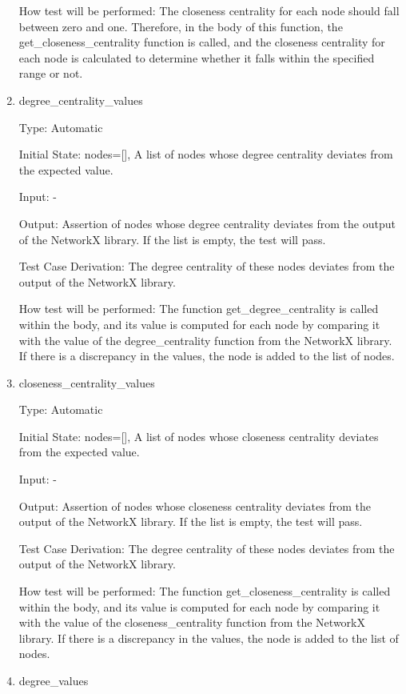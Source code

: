 \documentclass[12pt, titlepage]{article}
\begin{document}
\begin{enumerate}
How test will be performed: The closeness centrality for each node should fall between zero and one. Therefore, in the body of this function, the {get\_closeness\_centrality} function is called, and the closeness centrality for each node is calculated to determine whether it falls within the specified range or not.

\item{degree\_centrality\_values\\}

Type: Automatic
					
Initial State: nodes=[], A list of nodes whose degree centrality deviates from the expected value.
					
Input: -
					
Output: Assertion of nodes whose degree centrality deviates from the output of the NetworkX library. If the list is empty, the test will pass.

Test Case Derivation: The degree centrality of these nodes deviates from the output of the NetworkX library.

How test will be performed: 
The function {get\_degree\_centrality} is called within the body, and its value is computed for each node by comparing it with the value of the {degree\_centrality} function from the NetworkX library. If there is a discrepancy in the values, the node is added to the list of nodes.
					
\item{closeness\_centrality\_values\\}

Type:  Automatic
					
Initial State: nodes=[], A list of nodes whose closeness centrality deviates from the expected value.
					
Input: -
					
Output: Assertion of nodes whose closeness centrality deviates from the output of the NetworkX library. If the list is empty, the test will pass.

Test Case Derivation: The degree centrality of these nodes deviates from the output of the NetworkX library.

How test will be performed: The function {get\_closeness\_centrality} is called within the body, and its value is computed for each node by comparing it with the value of the {closeness\_centrality} function from the NetworkX library. If there is a discrepancy in the values, the node is added to the list of nodes.

\item{degree\_values\\}


\end{enumerate}
\end{document}
